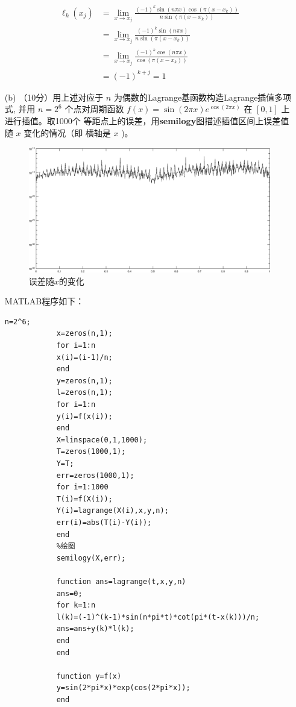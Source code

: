\documentclass[12pt,a4paper,utf8]{ctexart}
\begin{document}
\begin{enumerate}
		\begin{equation}
			\begin{aligned}
				\ell_{k}\left(x_{j}\right)&=\lim_{x\to x_{j}}\frac{(-1)^{k}\sin( n\pi x)\cos(\pi (x-x_{k}))}{n\sin(\pi (x-x_{k}))}\\
				&=\lim_{x\to x_{j}}\frac{(-1)^{k}\sin( n\pi x)}{n\sin(\pi (x-x_{k}))}\\&=\lim_{x\to x_{j}}\frac{(-1)^{k}\cos( n\pi x)}{\cos(\pi (x-x_{k}))}\\&=(-1)^{k+j}=1
			\end{aligned}			
		\end{equation}

		
		
		\item[(b)]（10分）用上述对应于 $n$ 为偶数的Lagrange基函数构造Lagrange插值多项式, 并用 $n=2^{6}$ 个点对周期函数 $f(x)=\sin (2 \pi x) e^{\cos (2 \pi x)}$ 在 $[0,1]$ 上进行插值。取1000个 等距点上的误差，用\textbf{semilogy}图描述插值区间上误差值随 $x$ 变化的情况（即 横轴是 $x$ )。
		\begin{figure}[H]
			\centering
			\includegraphics[width=\textwidth]{3semilogy}
			\caption{误差随$x$的变化}  
			\label{7}  
		\end{figure} 
	MATLAB程序如下：
		\begin{lstlisting}[breaklines,frame=single]
			n=2^6;
			x=zeros(n,1);
			for i=1:n
			x(i)=(i-1)/n;
			end
			y=zeros(n,1);
			l=zeros(n,1);
			for i=1:n
			y(i)=f(x(i));
			end
			X=linspace(0,1,1000);
			T=zeros(1000,1);
			Y=T;
			err=zeros(1000,1);
			for i=1:1000
			T(i)=f(X(i));
			Y(i)=lagrange(X(i),x,y,n);
			err(i)=abs(T(i)-Y(i));
			end
			%绘图
			semilogy(X,err);
	
			function ans=lagrange(t,x,y,n)
			ans=0;
			for k=1:n
			l(k)=(-1)^(k-1)*sin(n*pi*t)*cot(pi*(t-x(k)))/n;
			ans=ans+y(k)*l(k);
			end
			end
			
			function y=f(x)
			y=sin(2*pi*x)*exp(cos(2*pi*x));
			end
		\end{lstlisting}
	\end{enumerate}
\end{document}
